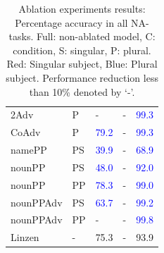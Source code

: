 \begin{center}
\begin{table}[ht]
\begin{tabular}{|P{2.3cm}|P{0.4cm}||P{0.6cm}|P{0.6cm}|P{0.6cm}|}
2Adv & P & - &  - &   \textcolor{blue}{99.3} \\

CoAdv & P &  \textcolor{blue}{79.2} &  - &   \textcolor{blue}{99.3} \\

namePP & PS & \textcolor{blue}{39.9} &  - &   \textcolor{blue}{68.9} \\

nounPP & PS &  \textcolor{blue}{48.0} & - &   \textcolor{blue}{92.0} \\

nounPP & PP &  \textcolor{blue}{78.3} & - &   \textcolor{blue}{99.0} \\

nounPPAdv & PS & \textcolor{blue}{63.7} &  - &   \textcolor{blue}{99.2} \\

nounPPAdv & PP & - &  - &   \textcolor{blue}{99.8} \\

\hline

\B Linzen & \B - &   75.3 &  - &  93.9 \\
\hline

\end{tabular}
\caption{Ablation experiments results: Percentage accuracy in all NA-tasks. Full: non-ablated model, C: condition, S: singular, P: plural. Red: Singular subject, Blue: Plural subject. Performance reduction less than 10\% denoted by `-'.  \label{tab:ablation-results}}
\end{table}
\end{center}

